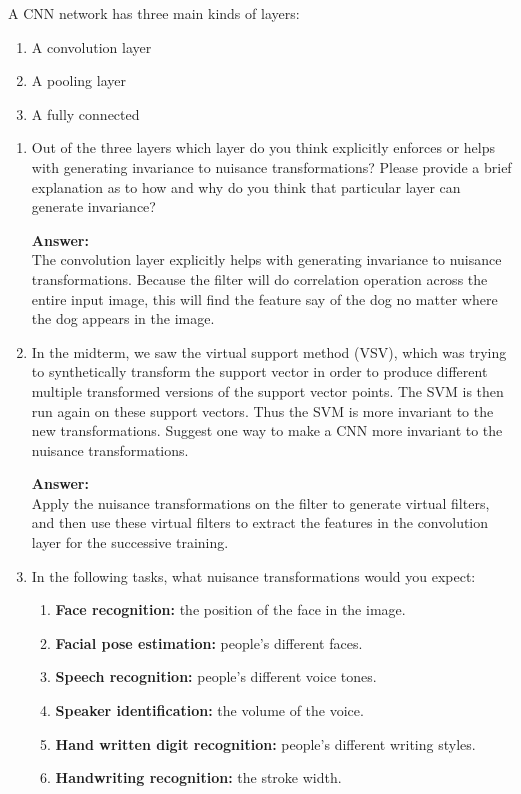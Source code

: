\documentclass[letterpaper,11pt]{article}
\begin{document}
A CNN network has three main kinds of layers:
\begin{enumerate}
	\item A convolution layer
	\item A pooling layer
	\item A fully connected
\end{enumerate}

\begin{enumerate}
	\item Out of the three layers which layer do you think explicitly enforces or helps with generating invariance to nuisance transformations? Please provide a brief explanation as to how and why do you think that particular layer can generate invariance?
	
	\textbf{Answer:}\\
	The convolution layer explicitly helps with generating invariance to nuisance transformations. Because the filter will do correlation operation across the entire input image, this will find the feature say of the dog no matter where the dog appears in the image.
	
	\item In the midterm, we saw the virtual support method (VSV), which was trying to synthetically transform the support vector in order to produce different multiple transformed versions of the support vector points. The SVM is then run again on these support vectors. Thus the SVM is more invariant to the new transformations. Suggest one way to make a CNN more invariant to the nuisance transformations.
	
	\textbf{Answer:}\\
	Apply the nuisance transformations on the filter to generate virtual filters, and then use these virtual filters to extract the features in the convolution layer for the successive training.
	
	\item In the following tasks, what nuisance transformations would you expect:
	\begin{enumerate}
		\item \textbf{Face recognition:} the position of the face in the image.
		\item \textbf{Facial pose estimation:} people's different faces.
		\item \textbf{Speech recognition:} people's different voice tones.
		\item \textbf{Speaker identification:} the volume of the voice.
		\item \textbf{Hand written digit recognition:} people's different writing styles.
		\item \textbf{Handwriting recognition:} the stroke width.
	\end{enumerate}
\end{enumerate}
\end{document}
